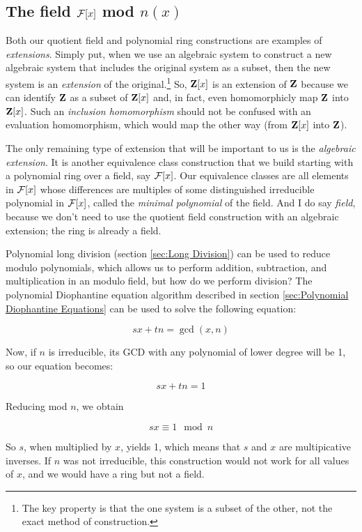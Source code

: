 \subsection*{\qquad The field ${\cal F}[x]$ mod $n(x)$}

Both our quotient field and polynomial ring constructions are examples
of {\it extensions}.  Simply put, when we use an algebraic system to
construct a new algebraic system that includes the original system as
a subset, then the new system is an {\it extension} of the
original.\footnote{The key property is that the one system is a subset
of the other, not the exact method of construction.}  So, ${\bf Z}[x]$
is an extension of ${\bf Z}$ because we can identify ${\bf Z}$ as a
subset of ${\bf Z}[x]$ and, in fact, even homomorphicly map ${\bf Z}$
into ${\bf Z}[x]$.  Such an {\it inclusion homomorphism} should not be
confused with an evaluation homomorphism, which would map the other
way (from ${\bf Z}[x]$ into ${\bf Z}$).

The only remaining type of extension that will be important to us is
the {\it algebraic extension}.  It is another equivalence class
construction that we build starting with a polynomial ring over a
field, say ${\cal F}[x]$.  Our equivalence classes are all elements in
${\cal F}[x]$ whose differences are multiples of some distinguished
irreducible polynomial in ${\cal F}[x]$, called the {\it minimal
polynomial} of the field.  And I do say {\it field}, because we don't
need to use the quotient field construction with an algebraic
extension; the ring is already a field.

Polynomial long division (section \ref{sec:Long Division})
can be used to reduce modulo polynomials, which allows
us to perform addition, subtraction, and multiplication
in an modulo field, but how do we perform division?
The polynomial Diophantine equation algorithm
described in section \ref{sec:Polynomial Diophantine Equations}
can be used to solve the following equation:

$$sx + tn = \gcd(x,n)$$

Now, if $n$ is irreducible, its GCD with any polynomial
of lower degree will be 1, so our equation becomes:

$$sx + tn = 1$$

Reducing mod $n$, we obtain

$$sx \equiv 1 \mod n$$

So $s$, when multiplied by $x$, yields 1, which means
that $s$ and $x$ are multipicative inverses.
If $n$ was not irreducible, this construction would
not work for all values of $x$, and we would have
a ring but not a field.

